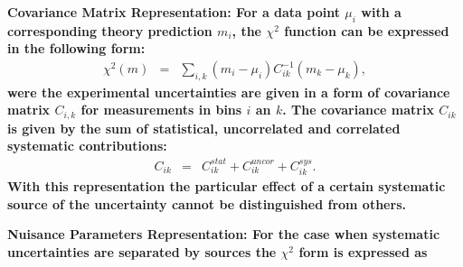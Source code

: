 \begin{description}
\item \bf {Covariance Matrix Representation:} \rm
For a data point $\mu_i$ with a corresponding theory prediction $m_i$, 
the $\chi^2$ function 
can be expressed in the following form:
%
\begin{eqnarray}
\chi^2 (m)& = & \sum_{i,k}(m_i-\mu_i)C^{-1}_{ik}(m_k-\mu_k),
\end{eqnarray}
were the experimental uncertainties are given in a form of covariance matrix $C_{i,k}$ for measurements in bins $i$ an $k$.
The covariance matrix $C_{ik}$ is given by the sum of statistical, uncorrelated and correlated systematic contributions: 
\begin{eqnarray}
C_{ik}& = & C^{stat}_{ik}+C^{uncor}_{ik}+C^{sys}_{ik}.
\end{eqnarray}
With this representation the particular effect of a certain systematic source of the uncertainty 
cannot be distinguished from others.

\item \bf{Nuisance Parameters Representation:} \rm
For the case when systematic uncertainties are separated by sources
the $\chi^2$ form is expressed as
\label{sec:nuisance_representation}


\end{description}
